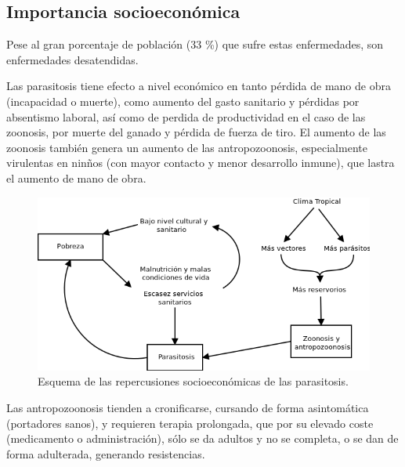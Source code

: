 \subsection{Importancia socioeconómica}
Pese al gran porcentaje de población (33 \%) que sufre estas enfermedades, son enfermedades desatendidas.
\begin{multicols}{2}
	Las parasitosis tiene efecto a nivel económico en tanto pérdida de mano de obra (incapacidad o muerte), como aumento del gasto sanitario y pérdidas por absentismo laboral, así como de perdida de productividad en el caso de las zoonosis, por muerte del ganado y pérdida de fuerza de tiro. El aumento de las zoonosis también genera un aumento de las antropozoonosis, especialmente virulentas en ninños (con mayor contacto y menor desarrollo inmune), que lastra el aumento de mano de obra.
	\columnbreak
	\begin{figure}[H]
		\centering
		\includegraphics[width=0.9\columnwidth]{A.imagenes/ACV-BioSan-Parasit-ImportSocioecon}
		\caption[Repercusiones de las parasitosis]{Esquema de las repercusiones socioeconómicas de las parasitosis.\label{fig:PARASIT:ConsecSocioecon}}
	\end{figure}
\end{multicols}
Las antropozoonosis tienden a cronificarse, cursando de forma asintomática (portadores sanos), y requieren terapia prolongada, que por su elevado coste (medicamento o administración), sólo se da adultos y no se completa, o se dan de forma adulterada, generando resistencias.

